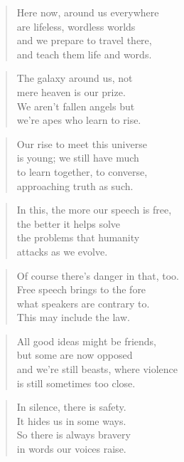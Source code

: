\documentclass[14pt,a4paper]{article}
\begin{document}
\begin{verse}
Here now, around us everywhere\\
are lifeless, wordless worlds\\
and we prepare to travel there,\\
and teach them life and words.
\end{verse}

\begin{verse}
The galaxy around us, not\\
mere heaven is our prize.\\
We aren’t fallen angels but\\
we’re apes who learn to rise.
\end{verse}

\begin{verse}
Our rise to meet this universe\\
is young; we still have much\\
to learn together, to converse,\\
approaching truth as such.
\end{verse}

\begin{verse}
In this, the more our speech is free,\\
the better it helps solve\\
the problems that humanity\\
attacks as we evolve.
\end{verse}

\begin{verse}
Of course there’s danger in that, too.\\
Free speech brings to the fore\\
what speakers are contrary to.\\
This may include the law.
\end{verse}

\begin{verse}
All good ideas might be friends,\\
but some are now opposed\\
and we’re still beasts, where violence\\
is still sometimes too close.
\end{verse}

\begin{verse}
In silence, there is safety.\\
It hides us in some ways.\\
So there is always bravery\\
in words our voices raise.\\
\end{verse}
\end{document}
